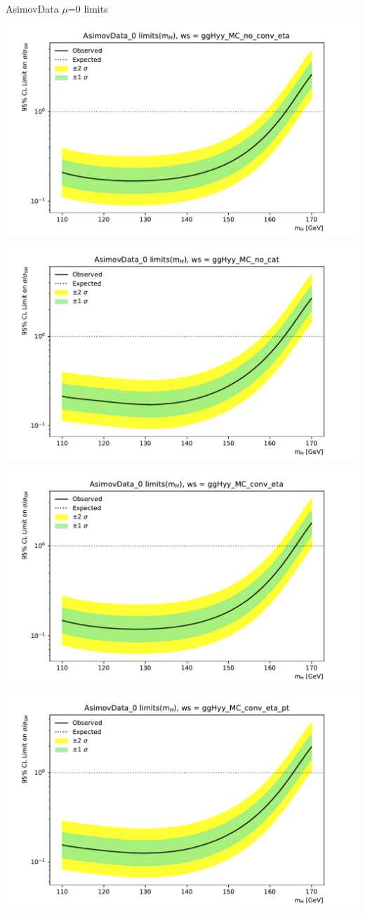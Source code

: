 \documentclass[10pt,UKenglish, leqno, xcolor = dvipsnames]{beamer}
\begin{document}
		\begin{frame}{AsimovData $\mu$=0 limits}
			\vfill
			\centering
			\includegraphics[width=.45\textwidth]{../images/week_13/plot_AsimovData_0_ggHyy_MC_no_conv_eta.pdf}
			\includegraphics[width=.45\textwidth]{../images/week_13/plot_AsimovData_0_ggHyy_MC_no_cat.pdf}\\
			\includegraphics[width=.45\textwidth]{../images/week_13/plot_AsimovData_0_ggHyy_MC_conv_eta.pdf}	\includegraphics[width=.45\textwidth]{../images/week_13/plot_AsimovData_0_ggHyy_MC_conv_eta_pt.pdf}	
			\vfill
		\end{frame}
	
\end{document}
